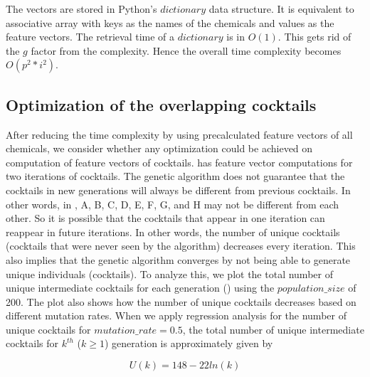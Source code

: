 
The vectors are stored in Python's $dictionary$ data structure. It is equivalent to associative array with keys as the names of the chemicals and values as the feature vectors. The retrieval time of a $dictionary$ is in $O(1)$. This gets rid of the $g$ factor from the complexity. Hence the overall time complexity becomes
$O ( p^2 * i^2 )$.%



\subsection{Optimization of the overlapping cocktails}\label{sec:GA-runtime-overlap-cocktails}

After reducing the time complexity by using precalculated feature vectors of all chemicals, we consider whether any optimization could be achieved on computation of feature vectors of cocktails. %
 has feature vector computations for two iterations of cocktails. The genetic algorithm does not guarantee that the cocktails in new generations will always be different from previous cocktails. In other words, in , A, B, C, D, E, F, G, and H may not be different from each other.
So it is possible that the cocktails that appear in one iteration can reappear in future iterations. In other words, the number of unique cocktails (cocktails that were never seen by the algorithm)  decreases every iteration. This also implies that the genetic algorithm converges by not being able to generate unique individuals (cocktails). To analyze this, we plot the total number of unique intermediate cocktails for each generation () using the $population\_size$ of 200. The plot also shows how the number of unique cocktails decreases based on different mutation rates. When we apply regression analysis for the number of unique cocktails for $mutation\_rate = 0.5$, the total number of unique intermediate cocktails for $k^{th}$ ($k \geq 1$) generation is approximately given by

\begin{equation}
U(k) = 148 - 22 ln(k)  \label{eq}
\end{equation}

